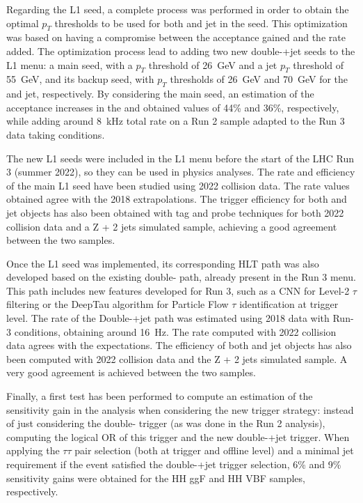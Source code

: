 \documentclass[../main.tex]{subfiles}
\begin{document}
Regarding the L1 seed, a complete process was performed in order to obtain the optimal $p_T$ thresholds to be used for both \tauh{} and jet in the seed. This optimization was based on having a compromise between the acceptance gained and the rate added. The optimization process lead to adding two new double-\tauh{}+jet seeds to the L1 menu: a main seed, with a \tauh{} $p_T$ threshold of 26~GeV and a jet $p_T$ threshold of 55~GeV, and its backup seed, with $p_T$ thresholds of 26~GeV and 70~GeV for the \tauh{} and jet, respectively. By considering the main seed, an estimation of the acceptance increases in the \htt{} and \hhbbtt{} obtained values of 44\% and 36\%, respectively, while adding around 8~kHz total rate on a Run 2 sample adapted to the Run 3 data taking conditions.

The new L1 seeds were included in the L1 menu before the start of the LHC Run 3 (summer 2022), so they can be used in physics analyses. The rate and efficiency of the main L1 seed have been studied using 2022 collision data. The rate values obtained agree with the 2018 extrapolations. The trigger efficiency for both \tauh{} and jet objects has also been obtained with tag and probe techniques for both 2022 collision data and a Z + 2 jets simulated sample, achieving a good agreement between the two samples.

Once the L1 seed was implemented, its corresponding HLT path was also developed based on the existing double-\tauh{} path, already present in the Run 3 menu. This path includes new features developed for Run 3, such as a CNN for Level-2 $\tau$ filtering or the DeepTau algorithm for Particle Flow $\tau$ identification at trigger level. The rate of the Double-\tauh{}+jet path was estimated using 2018 data with Run-3 conditions, obtaining around 16~Hz. The rate computed with 2022 collision data agrees with the expectations. The efficiency of both \tauh{} and jet objects has also been computed with 2022 collision data and the Z + 2 jets simulated sample. A very good agreement is achieved between the two samples.

Finally, a first test has been performed to compute an estimation of the sensitivity gain in the \hhbbtt{} analysis when considering the new trigger strategy: instead of just considering the double-\tauh{} trigger (as was done in the Run 2 analysis), computing the logical OR of this trigger and the new double-\tauh{}+jet trigger. When applying the $\tau\tau${} pair selection (both at trigger and offline level) and a minimal jet requirement if the event satisfied the double-\tauh{}+jet trigger selection, 6\% and 9\% sensitivity gains were obtained for the HH ggF and HH VBF samples, respectively.
\end{document}
